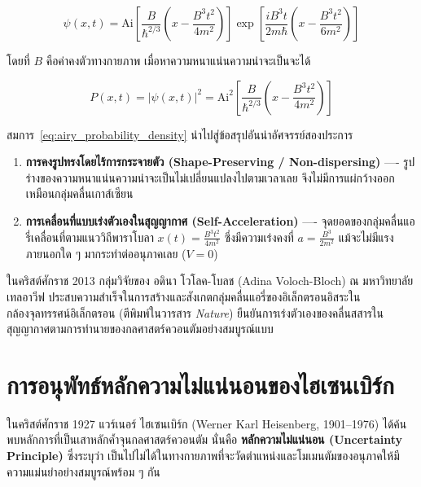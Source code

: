 \begin{equation}
\psi(x, t) = \text{Ai}\left[ \frac{B}{\hbar^{2/3}}\left( x - \frac{B^3 t^2}{4 m^2} \right) \right] \exp\left[ \frac{i B^3 t}{2 m \hbar}\left( x - \frac{B^3 t^2}{6 m^2} \right) \right]
\label{eq:airy_wave_packet}
\end{equation}

โดยที่ $B$ คือค่าคงตัวทางกายภาพ เมื่อหาความหนาแน่นความน่าจะเป็นจะได้

\begin{equation}
P(x, t) = |\psi(x, t)|^2 = \text{Ai}^2\left[ \frac{B}{\hbar^{2/3}}\left( x - \frac{B^3 t^2}{4 m^2} \right) \right]
\label{eq:airy_probability_density}
\end{equation}

สมการ~\eqref{eq:airy_probability_density} นำไปสู่ข้อสรุปอันน่าอัศจรรย์สองประการ
\begin{enumerate}
    \item \textbf{การคงรูปทรงโดยไร้การกระจายตัว (Shape-Preserving / Non-dispersing)} ---- รูปร่างของความหนาแน่นความน่าจะเป็นไม่เปลี่ยนแปลงไปตามเวลาเลย จึงไม่มีการแผ่กว้างออกเหมือนกลุ่มคลื่นเกาส์เซียน
    \item \textbf{การเคลื่อนที่แบบเร่งตัวเองในสุญญากาศ (Self-Acceleration)} ---- จุดยอดของกลุ่มคลื่นแอรี่เคลื่อนที่ตามแนววิถีพาราโบลา $x(t) = \frac{B^3 t^2}{4 m^2}$ ซึ่งมีความเร่งคงที่ $a = \frac{B^3}{2 m^2}$ แม้จะไม่มีแรงภายนอกใด ๆ มากระทำต่ออนุภาคเลย ($V = 0$)
\end{enumerate}

ในคริสต์ศักราช 2013 กลุ่มวิจัยของ อดินา โวโลค-โบลช (Adina Voloch-Bloch) ณ มหาวิทยาลัยเทลอาวีฟ ประสบความสำเร็จในการสร้างและสังเกตกลุ่มคลื่นแอรี่ของอิเล็กตรอนอิสระในกล้องจุลทรรศน์อิเล็กตรอน (ตีพิมพ์ในวารสาร \textit{Nature}) ยืนยันการเร่งตัวเองของคลื่นสสารในสุญญากาศตามการทำนายของกลศาสตร์ควอนตัมอย่างสมบูรณ์แบบ

\section{การอนุพัทธ์หลักความไม่แน่นอนของไฮเซนเบิร์ก}

ในคริสต์ศักราช 1927 แวร์เนอร์ ไฮเซนเบิร์ก (Werner Karl Heisenberg, 1901--1976) ได้ค้นพบหลักการที่เป็นเสาหลักค้ำจุนกลศาสตร์ควอนตัม นั่นคือ \textbf{หลักความไม่แน่นอน (Uncertainty Principle)} ซึ่งระบุว่า เป็นไปไม่ได้ในทางกายภาพที่จะวัดตำแหน่งและโมเมนตัมของอนุภาคให้มีความแม่นยำอย่างสมบูรณ์พร้อม ๆ กัน

